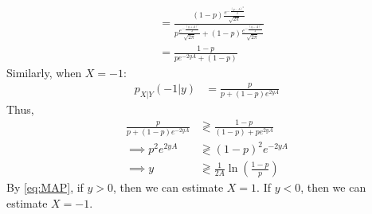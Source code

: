 \documentclass[journal,12pt,twocolumn]{IEEEtran}
\numberwithin{equation}{section}
\renewcommand\thesection{\arabic{section}}
\providecommand{\brak}[1]{\ensuremath{\left(#1\right)}}
\begin{document}
\begin{enumerate}[label=\thesection.\arabic*
        ,ref=\thesection.\theenumi]
\begin{align}
                           & = \frac{\left(1-p\right) \frac{e^{-\frac{(y-A)^2}{2}}}{\sqrt{2\pi}}}{ p \frac{e^{-\frac{(y+A)^2}{2}}}{\sqrt{2\pi}} + \left(1-p\right) \frac{e^{-\frac{(y-A)^2}{2}}}{\sqrt{2\pi}}} \\
                           & = \frac{1-p}{pe^{-2yA} + (1-p)}
          \end{align}
          Similarly, when $X = -1$:
          \begin{align}
              p_{X|Y}(-1|y) & = \frac{p}{p + \left(1-p\right) e^{2yA}}
          \end{align}
          Thus,
          \begin{align}
              \frac{p}{p + \brak{1 - p}e^{-2yA}} & \gtrless \frac{1 - p}{\brak{1 - p} + pe^{2yA}}   \\
              \implies p^2e^{2yA}                & \gtrless \brak{1 - p}^2e^{-2yA}                  \\
              \implies y                         & \gtrless \frac{1}{2A}\ln{\brak{\frac{1 - p}{p}}}
              \label{eq:MAP}
          \end{align}
          By \eqref{eq:MAP}, if $y > 0$, then we can estimate $X=1$. If $y<0$, then we can estimate $X=-1$.
\end{enumerate}
\end{document}
